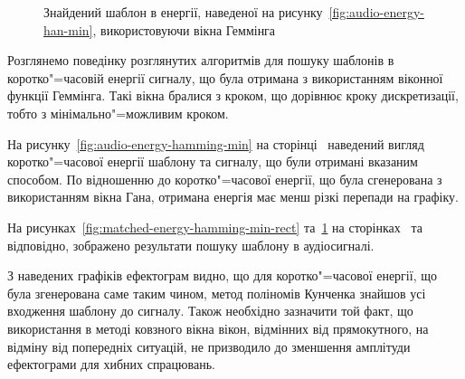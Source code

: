 \begin{figure}[h]

            \caption{Знайдений шаблон в енергії, наведеної на рисунку~\ref{fig:audio-energy-han-min}, використовуючи
                вікна Геммінга}
            \label{fig:matched-energy-han-min-hamming}
        \end{figure}

        \clearpage

        Розглянемо поведінку розглянутих алгоритмів для пошуку шаблонів в коротко"=часовій енергії сигналу, що була
        отримана з використанням віконної функції Геммінга.
        Такі вікна бралися з кроком, що дорівнює кроку дискретизації, тобто з мінімально"=можливим кроком.

        На рисунку~\ref{fig:audio-energy-hamming-min} на сторінці~\pageref{fig:audio-energy-han-min} наведений
        вигляд коротко"=часової енергії шаблону та сигналу, що були отримані вказаним способом.
        По відношенню до коротко"=часової енергії, що була сгенерована з використанням вікна Гана, отримана енергія
        має менш різкі перепади на графіку.

        На рисунках~\ref{fig:matched-energy-hamming-min-rect} та~\ref{fig:matched-energy-han-min-hamming} на
        сторінках~\pageref{fig:matched-energy-hamming-min-rect} та~\pageref{fig:matched-energy-han-min-hamming}
        відповідно, зображено результати пошуку шаблону в аудіосигналі.

        З наведених графіків ефектограм видно, що для коротко"=часової енергії, що була згенерована саме таким чином,
        метод поліномів Кунченка знайшов усі входження шаблону до сигналу.
        Також необхідно зазначити той факт, що використання в методі ковзного вікна вікон, відмінних від прямокутного,
        на відміну від попередніх ситуацій, не призводило до зменшення амплітуди ефектограми для хибних спрацювань.

